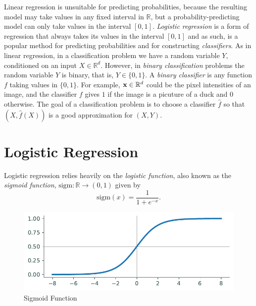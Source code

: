 \newcommand{\bbeta}{\boldsymbol\beta}
\newcommand{\trans}{^\mathsf{T}}
\newcommand{\softmax}{\mathscr{S}}      %
\newcommand{\cat}{\text{Cat}}
\newcommand{\logistic}{\text{sigm}}


Linear regression is unsuitable for predicting probabilities, because the resulting model may take values in any fixed interval in $\mathbb{R}$, but a probability-predicting model can only take values in the interval $[0,1]$.
\emph{Logistic regression} is a form of regression that always takes its values in the interval $[0,1]$ and as such, is a popular method for predicting probabilities and for constructing \emph{classifiers}.
As in linear regression, in a classification problem we have a random variable $Y$, conditioned on an input $X \in \mathbb{R}^d$.
However, in \emph{binary classification} problems the random variable $Y$ is binary, that is, $Y\in\{0,1\}$.
A \emph{binary classifier} is any function $f$ taking values in $\{0,1\}$.
For example, $\mathbf{x}\in \mathbb{R}^d$ could be the pixel intensities of an image, and the classifier $f$ gives $1$ if the image is a picuture of a duck and $0$ otherwise.
The goal of a classification problem is to choose a classifier $\widehat{f}$ so that $(X,\widehat{f}(X))$ is a good approximation for $(X,Y)$.

\section*{Logistic Regression}
Logistic regression relies heavily on the \emph{logistic function}, also known as the \emph{sigmoid function}, $\text{sigm} : \mathbb{R} \rightarrow (0,1)$ given by
\begin{equation}\label{eq:logistic}
\text{sigm}(x) = \frac{1}{1 + e^{-x}}.
\end{equation}

\begin{figure}[H]
    \includegraphics[width=.7\textwidth]{figures/sigmoid.pdf}
    \caption{Sigmoid Function}
\end{figure}

